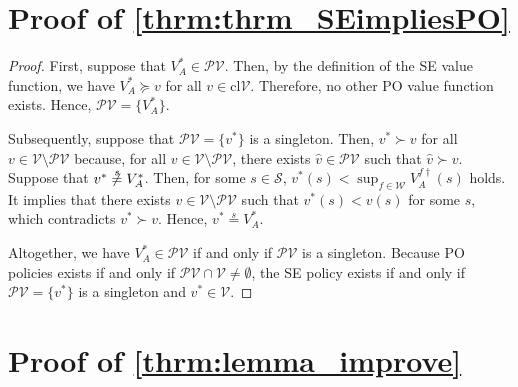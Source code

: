\documentclass{acml}
\providecommand{\eqs}{\stackrel{s}{=}}
\begin{document}
\section{Proof of \texorpdfstring{\cref{thrm:thrm_SEimpliesPO}}{Lg}}\label{apdx:thrm_SEimpliesPO}

\begin{proof}
	First, suppose that $V_A^* \in \mathcal{PV}$.
	Then, by the definition of the SE value function, we have $V_A^* \succcurlyeq v$ for all $v \in \mathrm{cl}\mathcal{V}$. 
	Therefore, no other PO value function exists. 
	Hence, $\mathcal{PV} = \{V_A^*\}$. 
	
	Subsequently, suppose that $\mathcal{PV} = \{v^*\}$ is a singleton.
	Then, $v^* \succ v$ for all $v \in \mathcal{V}\setminus \mathcal{PV}$ because,  for all $v\in\mathcal{V}\setminus \mathcal{PV}$, there exists $\hat{v}\in\mathcal{PV}$ such that $\hat{v}\succ v$. 
	Suppose that $v^* \not \eqs V_A^*$. Then, for some $s \in \mathcal{S}$, $v^*(s) < \sup_{f \in \mathcal{W}} V_A^{f\dag}(s)$ holds. It implies that there exists $v \in \mathcal{V}\setminus \mathcal{PV}$ such that $v^*(s) < v(s)$ for some $s$, which contradicts $v^* \succ v$. 
	Hence, $v^* \eqs V_A^*$.
	
	Altogether, we have $V_A^* \in \mathcal{PV}$ if and only if $\mathcal{PV}$ is a singleton.
	Because PO policies exists if and only if $\mathcal{PV} \cap \mathcal{V} \neq \emptyset$, the SE policy exists if and only if $\mathcal{PV} = \{v^*\}$ is a singleton and $v^* \in \mathcal{V}$.
\end{proof}

\section{Proof of \texorpdfstring{\cref{thrm:lemma_improve}}{Lg}}\label{apdx:lemma_improve}
\end{document}
